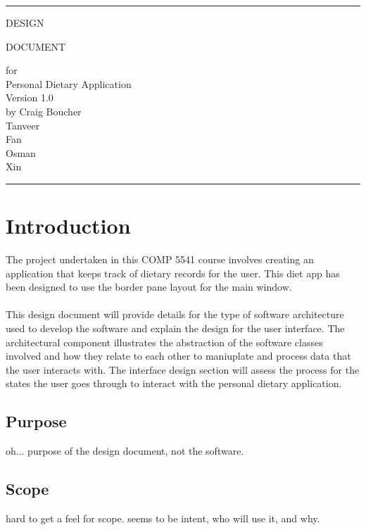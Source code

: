 \documentclass{scrreprt}
\date{}
\def\myversion{1.0}
\begin{document}
\begin{titlepage}
  \flushright\bfseries\huge
    \rule{\linewidth}{5pt}
    \par
    \vspace{1cm}
    {\Huge DESIGN \par DOCUMENT \par}
    \vspace{2cm}
    for \\
    \vspace{2cm}
    Personal Dietary Application \\
    \vspace{2cm}
     \LARGE{Version \myversion \\}
    \vspace{2cm}
    by Craig Boucher \\
    Tanveer \\
    Fan \\
    Osman \\
    Xin
    \vspace{2cm}
    \rule{\linewidth}{5pt}
\end{titlepage}
\tableofcontents
\chapter{Introduction}
The project undertaken in this COMP 5541 course involves creating an application that keeps track of dietary records for the user. This diet app has been designed to use the border pane layout for the main window. \\ \\ 
This design document will provide details for the type of software architecture used to develop the software and explain the design for the user interface. The architectural component illustrates the abstraction of the software classes involved and how they relate to each other to maniuplate and process data that the user interacts with. The interface design section will assess the process for the states the user goes through to interact with the personal dietary application.
\section{Purpose}
oh... purpose of the design document, not the software.
\section{Scope}
hard to get a feel for scope. seems to be intent, who will use it, and why.
\end{document}
